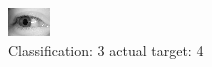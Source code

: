 \begin{figure}[h!]
\begin{center}
\includegraphics[width=0.60\columnwidth]{figures/ID3120_class_3_target_4.png}
\end{center}
\caption{ Classification: 3 actual target: 4}
\label{fig:ID3120_class_3_target_4}
\end{figure}
